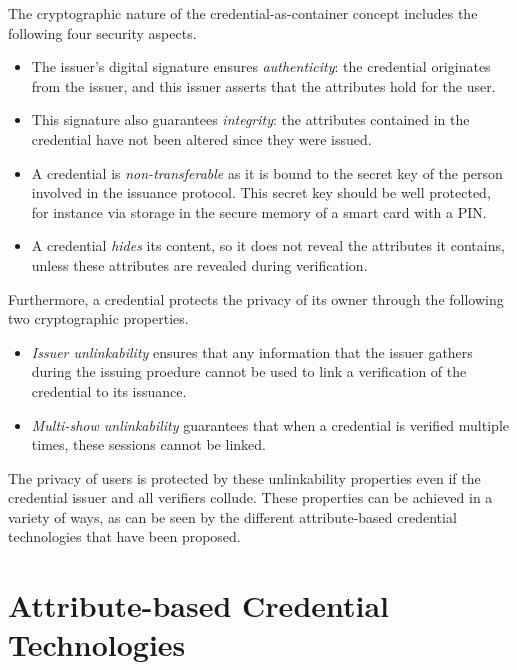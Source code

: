 The cryptographic nature of the credential-as-container concept includes the
following four security aspects.
\begin{itemize}
  \item The issuer's digital signature ensures \emph{authenticity}:
     the credential originates from the issuer, and this
    issuer asserts that the attributes hold for the user.
  \item This signature also guarantees \emph{integrity}:  the
    attributes contained in the credential have not been altered since they were
    issued.
  \item A credential is \emph{non-transferable} as
    it is bound to the secret key of the person involved in the issuance
    protocol. This secret key should be well protected, for instance via storage
    in the secure memory of a smart card with a PIN.
  \item A credential \emph{hides} its content, so it does not
    reveal the attributes it contains, unless these attributes are revealed
    during verification.
\end{itemize}
Furthermore, a credential protects the privacy of its owner
through the following two cryptographic properties.
\begin{itemize}
  \item \emph{Issuer unlinkability}
     ensures that any
    information that the issuer gathers during the issuing proedure cannot be 
    used to link a verification of the credential to its issuance.
  \item \emph{Multi-show unlinkability}
     guarantees
    that when a credential is verified multiple times, these sessions cannot be
    linked.
\end{itemize}
The privacy of users is protected by these unlinkability properties even if the
credential issuer and all verifiers collude. These properties can
be achieved in a variety of ways, as can be seen by the different
attribute-based credential technologies that have been proposed.

\section{Attribute-based Credential Technologies}

